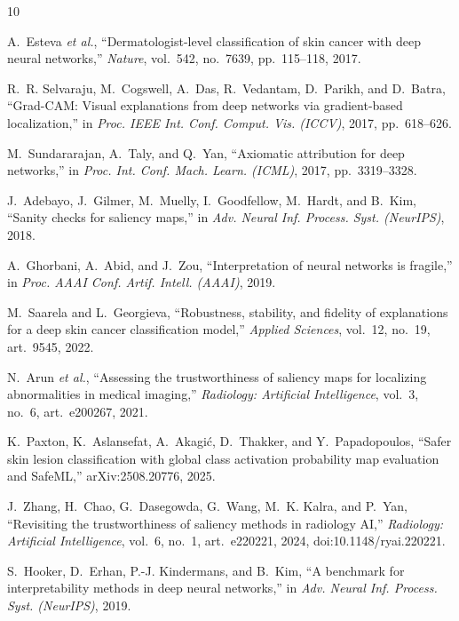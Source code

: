 \documentclass[conference]{IEEEtran}
\begin{document}
\begin{thebibliography}{10}

A.~Esteva \emph{et al.}, ``Dermatologist-level classification of skin cancer
with deep neural networks,'' \emph{Nature}, vol.~542, no.~7639,
pp.~115--118, 2017.

R.~R. Selvaraju, M.~Cogswell, A.~Das, R.~Vedantam, D.~Parikh, and
D.~Batra, ``Grad-CAM: Visual explanations from deep networks via
gradient-based localization,'' in \emph{Proc. IEEE Int. Conf. Comput. Vis.
(ICCV)}, 2017, pp.~618--626.

M.~Sundararajan, A.~Taly, and Q.~Yan, ``Axiomatic attribution for deep
networks,'' in \emph{Proc. Int. Conf. Mach. Learn. (ICML)}, 2017,
pp.~3319--3328.

J.~Adebayo, J.~Gilmer, M.~Muelly, I.~Goodfellow, M.~Hardt, and B.~Kim,
``Sanity checks for saliency maps,'' in \emph{Adv. Neural Inf. Process.
Syst. (NeurIPS)}, 2018.

A.~Ghorbani, A.~Abid, and J.~Zou, ``Interpretation of neural networks is
fragile,'' in \emph{Proc. AAAI Conf. Artif. Intell. (AAAI)}, 2019.

M.~Saarela and L.~Georgieva, ``Robustness, stability, and fidelity of
explanations for a deep skin cancer classification model,''
\emph{Applied Sciences}, vol.~12, no.~19, art.~9545, 2022.

N.~Arun \emph{et al.}, ``Assessing the trustworthiness of saliency maps
for localizing abnormalities in medical imaging,''
\emph{Radiology: Artificial Intelligence}, vol.~3, no.~6, art.~e200267, 2021.

K.~Paxton, K.~Aslansefat, A.~Akagi\'c, D.~Thakker, and
Y.~Papadopoulos, ``Safer skin lesion classification with global class
activation probability map evaluation and SafeML,'' arXiv:2508.20776, 2025.

J.~Zhang, H.~Chao, G.~Dasegowda, G.~Wang, M.~K. Kalra, and
P.~Yan, ``Revisiting the trustworthiness of saliency methods in
radiology AI,'' \emph{Radiology: Artificial Intelligence}, vol.~6, no.~1,
art.~e220221, 2024, doi:10.1148/ryai.220221.

S.~Hooker, D.~Erhan, P.-J. Kindermans, and B.~Kim, ``A benchmark for
interpretability methods in deep neural networks,'' in \emph{Adv. Neural
Inf. Process. Syst. (NeurIPS)}, 2019.


\end{thebibliography}
\end{document}
